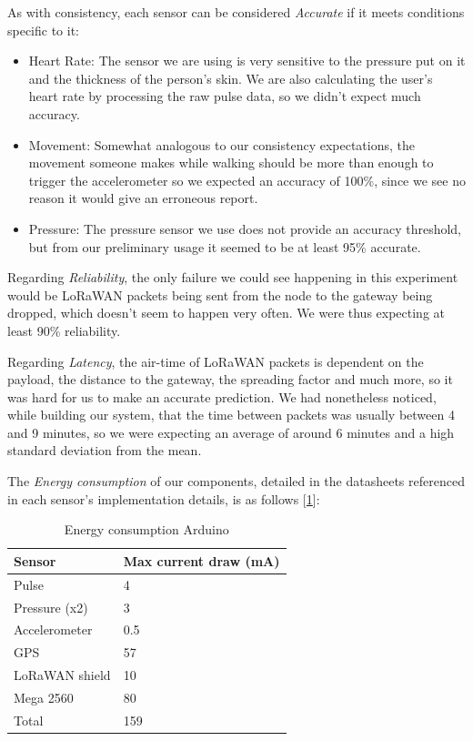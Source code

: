 		As with consistency, each sensor can be considered \emph{Accurate} if it meets conditions specific to it: 

		\begin{itemize}
			\item Heart Rate: The sensor we are using is very sensitive to the pressure put on it and the thickness of the person's skin. We are also calculating the user's heart rate by processing the raw pulse data, so we didn't expect much accuracy.
			\item Movement: Somewhat analogous to our consistency expectations, the movement someone makes while walking should be more than enough to trigger the accelerometer so we expected an accuracy of 100\%, since we see no reason it would give an erroneous report.
			\item Pressure: The pressure sensor we use does not provide an accuracy threshold, but from our preliminary usage it seemed to be at least 95\% accurate.
		\end{itemize}

		Regarding \emph{Reliability}, the only failure we could see happening in this experiment would be LoRaWAN packets being sent from the node to the gateway being dropped, which doesn't seem to happen very often. We were thus expecting at least 90\% reliability. 

		\newline
		
		Regarding \emph{Latency}, the air-time of LoRaWAN packets is dependent on the payload, the distance to the gateway, the spreading factor and much more, so it was hard for us to make an accurate prediction. We had nonetheless noticed, while building our system, that the time between packets was usually between 4 and 9 minutes, so we were expecting an average of around 6 minutes and a high standard deviation from the mean.

		\newline

		The \emph{Energy consumption} of our components, detailed in the datasheets referenced in each sensor's implementation details, is as follows [\ref{tab:EnergyConsumption}]:

			\begin{table}[h]
				\begin{tabular}{@{}ll@{}}
					\toprule
					Sensor         & Max current draw (mA) \\ \midrule
					Pulse          & 4                     \\
					Pressure (x2)  & 3                     \\
					Accelerometer  & 0.5                   \\
					GPS            & 57                    \\
					LoRaWAN shield & 10                    \\
					Mega 2560      & 80                    \\
					Total          & 159                   \\ \bottomrule
				\end{tabular}
				\caption[Energy consumption Arduino]{Energy consumption Arduino}
				\label{tab:EnergyConsumption}
			\end{table}

